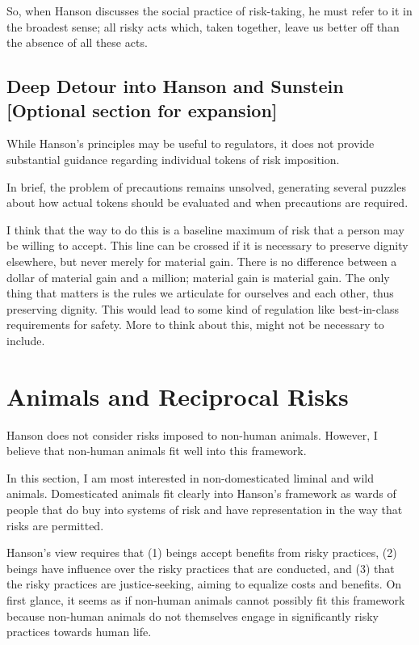 \documentclass[12pt]{article}
\begin{document}
So, when Hanson discusses the social practice of risk-taking, he must refer to
it in the broadest sense; all risky acts which, taken together, leave us better
off than the absence of all these acts.
 
\subsection{Deep Detour into Hanson and Sunstein [Optional section for
expansion]} While Hanson’s principles may be useful to regulators, it does not
provide substantial guidance regarding individual tokens of risk imposition.

In brief, the problem of precautions remains unsolved, generating several
puzzles about how actual tokens should be evaluated and when precautions are
required.

I think that the way to do this is a baseline maximum of risk that a person may
be willing to accept. This line can be crossed if it is necessary to preserve
dignity elsewhere, but never merely for material gain. There is no difference
between a dollar of material gain and a million; material gain is material
gain.  The only thing that matters is the rules we articulate for ourselves and
each other, thus preserving dignity. This would lead to some kind of regulation
like best-in-class requirements for safety. More to think about this, might not
be necessary to include.

\section{Animals and Reciprocal Risks}

Hanson does not consider risks imposed to non-human animals. However, I believe
that non-human animals fit well into this framework.

In this section, I am most interested in non-domesticated liminal and wild
animals. Domesticated animals fit clearly into Hanson’s framework as wards of
people that do buy into systems of risk and have representation in the way that
risks are permitted.

Hanson’s view requires that (1) beings accept benefits from risky practices,
(2) beings have influence over the risky practices that are conducted, and (3)
that the risky practices are justice-seeking, aiming to equalize costs and
benefits.  On first glance, it seems as if non-human animals cannot possibly
fit this framework because non-human animals do not themselves engage in
significantly risky practices towards human life.
\end{document}
